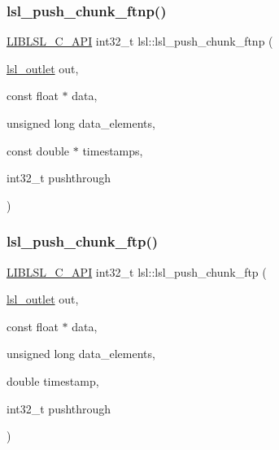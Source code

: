 \subsubsection{\texorpdfstring{lsl\+\_\+push\+\_\+chunk\+\_\+ftnp()}{lsl\_push\_chunk\_ftnp()}}
{\footnotesize\ttfamily \hyperlink{lsl__cpp_8h_aafd0ef1813e8be84a1420c4f1df64615}{L\+I\+B\+L\+S\+L\+\_\+\+C\+\_\+\+A\+PI} int32\+\_\+t lsl\+::lsl\+\_\+push\+\_\+chunk\+\_\+ftnp (\begin{DoxyParamCaption}\item[{\hyperlink{namespacelsl_abcf512b0f66dacf86c10b165995fd50b}{lsl\+\_\+outlet}}]{out,  }\item[{const float $\ast$}]{data,  }\item[{unsigned long}]{data\+\_\+elements,  }\item[{const double $\ast$}]{timestamps,  }\item[{int32\+\_\+t}]{pushthrough }\end{DoxyParamCaption})}

\mbox{\label{namespacelsl_adf8f3e407c2b25a0e68aaf4e27df742d}} 
\subsubsection{\texorpdfstring{lsl\+\_\+push\+\_\+chunk\+\_\+ftp()}{lsl\_push\_chunk\_ftp()}}
{\footnotesize\ttfamily \hyperlink{lsl__cpp_8h_aafd0ef1813e8be84a1420c4f1df64615}{L\+I\+B\+L\+S\+L\+\_\+\+C\+\_\+\+A\+PI} int32\+\_\+t lsl\+::lsl\+\_\+push\+\_\+chunk\+\_\+ftp (\begin{DoxyParamCaption}\item[{\hyperlink{namespacelsl_abcf512b0f66dacf86c10b165995fd50b}{lsl\+\_\+outlet}}]{out,  }\item[{const float $\ast$}]{data,  }\item[{unsigned long}]{data\+\_\+elements,  }\item[{double}]{timestamp,  }\item[{int32\+\_\+t}]{pushthrough }\end{DoxyParamCaption})}

\mbox{\label{namespacelsl_a096b23637c04d20bcaea1a92bc438845}} 
